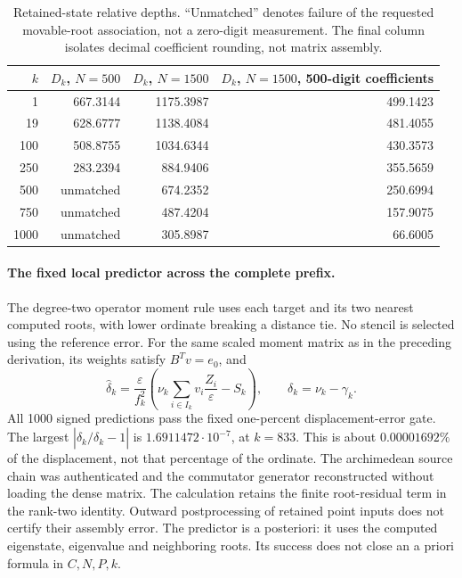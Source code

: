 \begin{table}[htbp]
\centering\small
\begin{tabular}{r rr r}
\toprule
$k$ & $D_k$, $N=500$ & $D_k$, $N=1500$ & $D_k$, $N=1500$, 500-digit coefficients\\
\midrule
1    &667.3144&1175.3987&499.1423\\
19   &628.6777&1138.4084&481.4055\\
100  &508.8755&1034.6344&430.3573\\
250  &283.2394&884.9406&355.5659\\
500  &unmatched&674.2352&250.6994\\
750  &unmatched&487.4204&157.9075\\
1000 &unmatched&305.8987&66.6005\\
\bottomrule
\end{tabular}
\caption{Retained-state relative depths. ``Unmatched'' denotes failure of
the requested movable-root association, not a zero-digit measurement.
The final column isolates decimal coefficient rounding, not matrix assembly.}
\label{tab:thousand-zero-depths}
\end{table}

\paragraph{The fixed local predictor across the complete prefix.}
The degree-two operator moment rule uses each target and its two nearest
computed roots, with lower ordinate breaking a distance tie. No stencil
is selected using the reference error. For the same scaled moment matrix
as in the preceding derivation, its weights satisfy $B^Tv=e_0$, and
\[
 \widehat\delta_k=\frac{\varepsilon}{f_k^2}
       \left(\nu_k\sum_{i\in I_k}v_i\frac{Z_i}{\varepsilon}-S_k\right),
 \qquad \delta_k=\nu_k-\gamma_k.
\]
All 1000 signed predictions pass the fixed one-percent displacement-error
gate. The largest $|\widehat\delta_k/\delta_k-1|$ is
$1.6911472\cdot10^{-7}$, at $k=833$. This is about
$0.00001692\%$ of the displacement, not that percentage of the ordinate.
The archimedean source chain was authenticated and the commutator
generator reconstructed without loading the dense matrix. The calculation
retains the finite root-residual term in the rank-two identity. Outward
postprocessing of retained point inputs does not certify their assembly
error. The predictor is a posteriori: it uses the computed eigenstate,
eigenvalue and neighboring roots. Its success does not close an a priori
formula in $C,N,P,k$.

